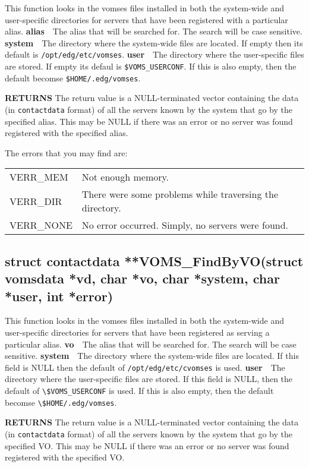 \documentclass[a4paper]{book}
\newcommand{\return}{\noindent \textbf{RETURNS}\newline}
\newcommand{\parameter}[1]{\newline\textbf{#1}\ \ }
\begin{document}
This function looks in the vomses files installed in both the
system-wide and user-specific directories for servers that have been
registered with a particular alias.
\parameter{alias}{The alias that will be searched for.  The search will be case
sensitive.}
\parameter{system}{The directory where the system-wide files are located.  
  If empty then its default is \verb|/opt/edg/etc/vomses|.}
\parameter{user}{The directory where the user-specific files are
  stored.  If empty its defaul is \verb|$VOMS_USERCONF|.  If this is
  also empty, then the default becomse \verb|$HOME/.edg/vomses|.}

\return
The return value is a NULL-terminated vector containing the data (in
\verb|contactdata| format) of all the servers known by the system
  that go by the specified alias.  This may be NULL if there was an
  error or no server was found registered with the specified alias.

The errors that you may find are:

\bigskip\begin{tabular}{lp{3in}}
VERR\_MEM  & Not enough memory.\\
VERR\_DIR  & There were some problems while traversing the directory.\\
VERR\_NONE & No error occurred. Simply, no servers were found.\\


\end{tabular}
\subsection{struct contactdata **VOMS\_FindByVO(struct vomsdata *vd,
  char *vo, char *system, char *user, int *error)}

This function looks in the vomses files installed in both the
system-wide and user-specific directories for servers that have been
registered as serving a particular alias.
\parameter{vo}{The alias that will be searched for.  The search will
be case sensitive.}
\parameter{system}{The directory where the system-wide files are
  located.  If this field is NULL then the default of
  \verb|/opt/edg/etc/cvomses| is used.}
\parameter{user}{The directory where the user-specific files are
  stored.  If this field is NULL, then the default of
  \verb|\$VOMS_USERCONF| is used.  If this is also empty, then the
  default becomse \verb|\$HOME/.edg/vomses|.}

\return
The return value is a NULL-terminated vector containing the data (in
\verb|contactdata| format) of all the servers known by the system
  that go by the specified VO.  This may be NULL if there was an
  error or no server was found registered with the specified VO.
\end{document}
